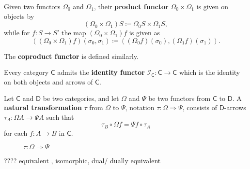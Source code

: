 \begin{df}
	Given two functors $\Omega_0$ and $\Omega_1$, 
	their \textbf{product functor} $\Omega_0 \times \Omega_1$ is given on objects by 
	\[
		(\Omega_0 \times \Omega_1) S 
		\coloneqq 
		\Omega_0 S \times \Omega_1 S,
	\]
	while for $f \colon S \to S'$ 
	the map $(\Omega_0 \times \Omega_1)f$ is given as 
	\[
		((\Omega_0 \times \Omega_1)f) (\sigma_0,\sigma_1) 
		\coloneqq 
		((\Omega_0 f)(\sigma_0), (\Omega_1 f)(\sigma_1)).
	\]

	The \textbf{coproduct functor} is defined similarly.
\end{df}




\begin{df}
	Every category $\mathsf{C}$ admits the \textbf{identity functor} $\mathcal{I}_\mathsf{C} \colon \mathsf{C} \to \mathsf{C}$ which is the identity on both objects and arrows of $\mathsf{C}$.
\end{df}






\begin{df}
	Let $\mathsf{C}$ and $\mathsf{D}$ be two categories, and let $\Omega$ and $\Psi$ be two functors from $\mathsf{C}$ to $\mathsf{D}$. 
	A \textbf{natural transformation} $\tau$ from $\Omega$ to $\Psi$, 
	notation {\color{red} $\tau \colon \Omega \Rightarrow \Psi$}, 
	consists of $\mathsf{D}$-arrows $\tau_A \colon \Omega A \to \Psi A$ such that 
	\[
		\tau_B \circ \Omega f = \Psi f \circ \tau_A
	\]
	for each $f \colon A \to B$ in $\mathsf{C}$.

	\begin{figure}[h]
		\centering
		\caption{$\tau \colon \Omega \Rightarrow \Psi$}
		\label{fig:}
	\end{figure}

\end{df}




???? equivalent , isomorphic,   dual/ dually equivalent






\clearpage
